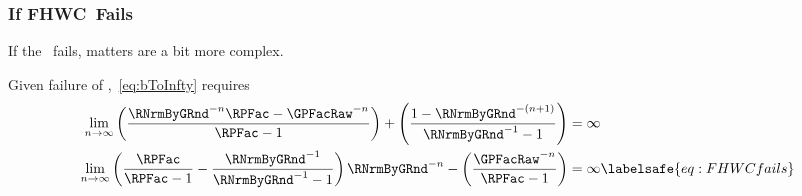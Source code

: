 \documentclass[\econtexRoot/BufferStockTheory]{subfiles}
\begin{document}

\subsubsection{If {FHWC}~Fails}
If the \FHWC~fails, matters are a bit more complex.

\begin{comment}
  As noted in the main text, the Finite Value Requirement for such a consumer
  requires $\GPFacRaw < (\Rfree/\PermGroFac)^{1/\CRRA}$,\footnote{A
    unique well-defined nondegenerate limiting consumption function can
    actually exist even if a nondegenerate value function does not.
But
    the parametric combinations required for this are somewhat peculiar
    (including both $\Rfree < 1$ and $\PermGroFac < 1$); but we restrict our attention
    to the more useful and plausible cases with finite value.} which is stronger (holds
  in strictly fewer circumstances) than the \GICRaw~condition $\GPFacRaw < 1$.
  Thus, the \GICRaw~is an implication of $\cncl{\FHWC}$.
\end{comment}

Given failure of \FHWC,~\eqref{eq:bToInfty} requires
\begin{equation}\begin{gathered}\begin{aligned}
  \lim_{n \rightarrow \infty} \left(\frac{\RNrmByGRnd^{-n}\RPFac-\GPFacRaw^{-n}}{\RPFac-1}\right) + \left(\frac{1-\RNrmByGRnd^{-(n+1)}}{\RNrmByGRnd^{-1}-1}\right)  & = \infty \notag
  \\   \lim_{n \rightarrow \infty} \left(\frac{\RPFac}{\RPFac-1}-\frac{\RNrmByGRnd^{-1}}{\RNrmByGRnd^{-1}-1}\right)\RNrmByGRnd^{-n}-\left(\frac{\GPFacRaw^{-n}}{\RPFac-1}\right)  & = \infty \labelsafe{eq:FHWCfails} 
\end{aligned}\end{gathered}\end{equation}
\hypertarget{PFGICHoldsFHWCFailsRICFailsDiscuss}{}
\end{document}
